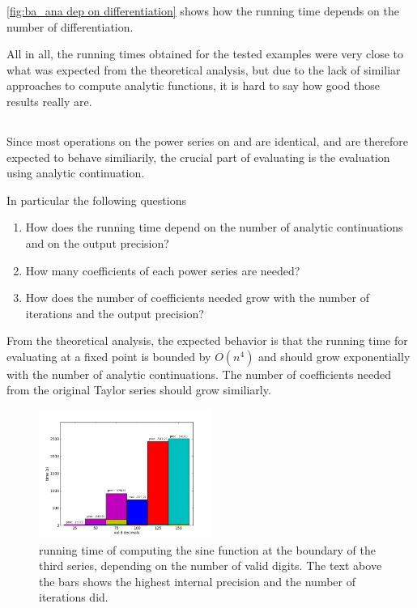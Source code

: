       \ref{fig:ba_ana dep on differentiation} shows how the running time depends on the number of differentiation. 

      All in all, the running times obtained for the tested examples were very close to what was expected from the theoretical analysis, but due to the lack 
      of similiar approaches to compute analytic functions, it is hard to say how good those results really are.

      \subsection{\anarect}
			Since most operations on the power series on \anarect and \baana are identical‚ and are therefore expected to behave similiarily, 
			the crucial part of evaluating \baana is the evaluation using analytic continuation.
			
			In particular the following questions
			\begin{enumerate}
				\item How does the running time depend on the number of analytic continuations and on the output precision?
				\item How many coefficients of each power series are needed?
				\item How does the number of coefficients needed grow with the number of iterations and the output precision?
			\end{enumerate} 

		From the theoretical analysis, the expected behavior is that the running time for evaluating at a fixed 
		point is bounded by $O(n^4)$ and should grow exponentially with the number of analytic continuations.
		The number of coefficients needed from the original Taylor series should grow similiarly. 


		\begin{figure}[h]
			\centering
			\includegraphics[width=0.5\textwidth]{img/analytic/sin_for_series_4_dep_on_n.png}
			\caption{running time of \anarect computing the sine function at the boundary of the third series, depending on the number of valid digits. The text above the bars shows the highest internal precision and the number of iterations \irram did.}
			\label{fig:sin dep on n}
		\end{figure}

